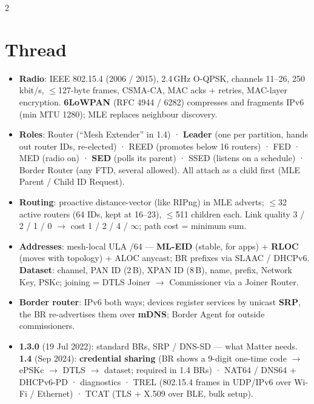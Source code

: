 \documentclass[8pt]{extarticle}
\begin{document}
\begin{multicols}{2}
\section{Thread}
\noindent{}
\begin{itemize}
  \item \textbf{Radio}: IEEE 802.15.4 (2006 / 2015), 2.4\,GHz O-QPSK, channels 11–26, 250\,kbit/s,
        $\le$127-byte frames, CSMA-CA, MAC acks + retries, MAC-layer encryption. \textbf{6LoWPAN} (RFC
        4944 / 6282) compresses and fragments IPv6 (min MTU 1280); MLE replaces neighbour discovery.
  \item \textbf{Roles}: Router (``Mesh Extender'' in 1.4) · \textbf{Leader} (one per partition, hands
        out router IDs, re-elected) · REED (promotes below 16 routers) · FED · MED (radio on) ·
        \textbf{SED} (polls its parent) · SSED (listens on a schedule) · Border Router (any FTD, several
        allowed). All attach as a child first (MLE Parent / Child ID Request).
  \item \textbf{Routing}: proactive distance-vector (like RIPng) in MLE adverts; $\le$32 active routers
        (64 IDs, kept at 16–23), $\le$511 children each. Link quality 3 / 2 / 1 / 0 $\to$ cost 1 / 2 /
        4 / $\infty$; path cost = minimum sum.
  \item \textbf{Addresses}: mesh-local ULA /64 — \textbf{ML-EID} (stable, for apps) + \textbf{RLOC}
        (moves with topology) + ALOC anycast; BR prefixes via SLAAC / DHCPv6. \textbf{Dataset}:
        channel, PAN ID (2\,B), XPAN ID (8\,B), name, prefix, Network Key, PSKc; joining = DTLS
        Joiner $\to$ Commissioner via a Joiner Router.
  \item \textbf{Border router}: IPv6 both ways; devices register services by unicast \textbf{SRP},
        the BR re-advertises them over \textbf{mDNS}; Border Agent for outside commissioners.
  \item \textbf{1.3.0} (19 Jul 2022): standard BRs, SRP / DNS-SD — what Matter needs. \textbf{1.4}
        (Sep 2024): \textbf{credential sharing} (BR shows a 9-digit one-time code $\to$ ePSKc $\to$
        DTLS $\to$ dataset; required in 1.4 BRs) · NAT64 / DNS64 + DHCPv6-PD · diagnostics · TREL
        (802.15.4 frames in UDP/IPv6 over Wi-Fi / Ethernet) · TCAT (TLS + X.509 over BLE, bulk setup).
\end{itemize}


\end{multicols}
\end{document}
